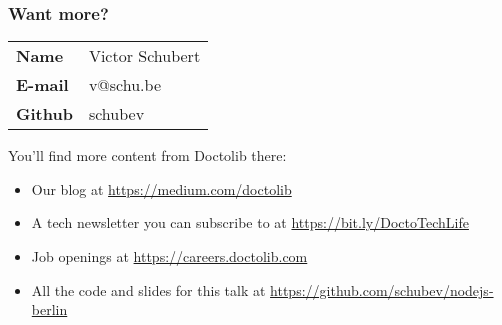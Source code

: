 \begin{frame}
	\frametitle{Want more?}

	\begin{center}
	\Large
	\begin{tabular}{>{\bfseries}ll}
		Name & Victor Schubert \\
		E-mail & v@schu.be \\
		Github & schubev \\
	\end{tabular}
		\vspace{1em}
	\newline
	\end{center}

	\large
	You’ll find more content from Doctolib there:
	\begin{itemize}
	\item Our blog at \url{https://medium.com/doctolib}
	\item A tech newsletter you can subscribe to at \url{https://bit.ly/DoctoTechLife}
	\item Job openings at \url{https://careers.doctolib.com}
	\item All the code and slides for this talk at \url{https://github.com/schubev/nodejs-berlin}
	\end{itemize}

\end{frame}
